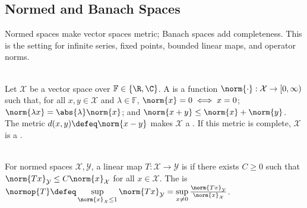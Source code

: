 \subsection{Normed and Banach Spaces}

%

Normed spaces make vector spaces metric; Banach spaces add completeness. This is the setting for infinite series, fixed points, bounded linear maps, and operator norms.

\begin{definition} \label{def:normed-and-banach-spaces} \\
Let $\mathcal{X}$ be a vector space over $\mathbb{F}\in\{\R,\C\}$. A  is a function $\norm{\cdot}:\mathcal{X}\to[0,\infty)$ such that, for all $x,y\in\mathcal{X}$ and $\lambda\in\mathbb{F}$, $\norm{x}=0\iff x=0$; $\norm{\lambda x}=\abs{\lambda}\norm{x}$; and $\norm{x+y}\leq\norm{x}+\norm{y}$.\\
The metric $d(x,y)\defeq\norm{x-y}$ makes $\mathcal{X}$ a . If this metric is complete, $\mathcal{X}$ is a .
\end{definition}

\begin{definition} \label{def:bounded-linear-maps-and-operator-norm} \\
For normed spaces $\mathcal{X},\mathcal{Y}$, a linear map $T:\mathcal{X}\to\mathcal{Y}$ is  if there exists $C\geq0$ such that $\norm{Tx}_{\mathcal{Y}}\leq C\norm{x}_{\mathcal{X}}$ for all $x\in\mathcal{X}$. The  is $\normop{T}\defeq \sup\limits_{\norm{x}_{\mathcal{X}}\leq1}\norm{Tx}_{\mathcal{Y}}=\sup\limits_{x\neq0}\frac{\norm{Tx}_{\mathcal{Y}}}{\norm{x}_{\mathcal{X}}}$.
\end{definition}

